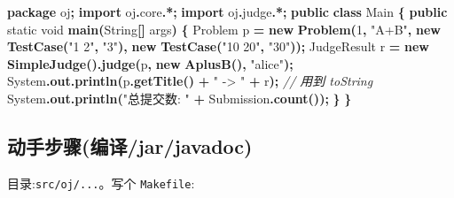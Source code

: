 \documentclass[
  11pt,
]{ctexart}
\newenvironment{Shaded}{\begin{snugshade}}{\end{snugshade}}
\newcommand{\BuiltInTok}[1]{#1}
\newcommand{\CommentTok}[1]{\textcolor[rgb]{0.56,0.35,0.01}{\textit{#1}}}
\newcommand{\DataTypeTok}[1]{\textcolor[rgb]{0.13,0.29,0.53}{#1}}
\newcommand{\DecValTok}[1]{\textcolor[rgb]{0.00,0.00,0.81}{#1}}
\newcommand{\FunctionTok}[1]{\textcolor[rgb]{0.13,0.29,0.53}{\textbf{#1}}}
\newcommand{\ImportTok}[1]{#1}
\newcommand{\KeywordTok}[1]{\textcolor[rgb]{0.13,0.29,0.53}{\textbf{#1}}}
\newcommand{\NormalTok}[1]{#1}
\newcommand{\OperatorTok}[1]{\textcolor[rgb]{0.81,0.36,0.00}{\textbf{#1}}}
\newcommand{\StringTok}[1]{\textcolor[rgb]{0.31,0.60,0.02}{#1}}
\begin{document}
\begin{Shaded}
\begin{Highlighting}[]
\KeywordTok{package}\ImportTok{ oj}\OperatorTok{;}
\KeywordTok{import} \ImportTok{oj}\OperatorTok{.}\ImportTok{core}\OperatorTok{.*;}
\KeywordTok{import} \ImportTok{oj}\OperatorTok{.}\ImportTok{judge}\OperatorTok{.*;}
\KeywordTok{public} \KeywordTok{class}\NormalTok{ Main }\OperatorTok{\{}
    \KeywordTok{public} \DataTypeTok{static} \DataTypeTok{void} \FunctionTok{main}\OperatorTok{(}\BuiltInTok{String}\OperatorTok{[]}\NormalTok{ args}\OperatorTok{)} \OperatorTok{\{}
\NormalTok{        Problem p }\OperatorTok{=} \KeywordTok{new} \FunctionTok{Problem}\OperatorTok{(}\DecValTok{1}\OperatorTok{,} \StringTok{"A+B"}\OperatorTok{,}
            \KeywordTok{new} \FunctionTok{TestCase}\OperatorTok{(}\StringTok{"1 2"}\OperatorTok{,} \StringTok{"3"}\OperatorTok{),}
            \KeywordTok{new} \FunctionTok{TestCase}\OperatorTok{(}\StringTok{"10 20"}\OperatorTok{,} \StringTok{"30"}\OperatorTok{));}
\NormalTok{        JudgeResult r }\OperatorTok{=} \KeywordTok{new} \FunctionTok{SimpleJudge}\OperatorTok{().}\FunctionTok{judge}\OperatorTok{(}\NormalTok{p}\OperatorTok{,} \KeywordTok{new} \FunctionTok{AplusB}\OperatorTok{(),} \StringTok{"alice"}\OperatorTok{);}
        \BuiltInTok{System}\OperatorTok{.}\FunctionTok{out}\OperatorTok{.}\FunctionTok{println}\OperatorTok{(}\NormalTok{p}\OperatorTok{.}\FunctionTok{getTitle}\OperatorTok{()} \OperatorTok{+} \StringTok{" {-}\textgreater{} "} \OperatorTok{+}\NormalTok{ r}\OperatorTok{);}   \CommentTok{// 用到 toString}
        \BuiltInTok{System}\OperatorTok{.}\FunctionTok{out}\OperatorTok{.}\FunctionTok{println}\OperatorTok{(}\StringTok{"总提交数: "} \OperatorTok{+}\NormalTok{ Submission}\OperatorTok{.}\FunctionTok{count}\OperatorTok{());}
    \OperatorTok{\}}
\OperatorTok{\}}
\end{Highlighting}
\end{Shaded}

\hypertarget{ux52a8ux624bux6b65ux9aa4ux7f16ux8bd1jarjavadoc}{%
\subsection{动手步骤(编译/jar/javadoc)}\label{ux52a8ux624bux6b65ux9aa4ux7f16ux8bd1jarjavadoc}}

目录:\texttt{src/oj/...}。写个 \texttt{Makefile}:

\begin{Shaded}
\end{Shaded}
\end{document}
